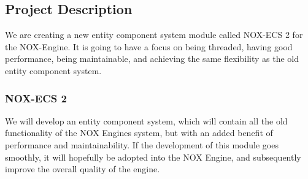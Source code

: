 \subsection{Project Description}
We are creating a new entity component system module called NOX-ECS 2 for the NOX-Engine. 
It is going to have a focus on being threaded, having good performance, being maintainable, and achieving the same flexibility as the old entity component system.

\subsubsection{NOX-ECS 2}
We will develop an entity component system, which will contain all the old functionality of the NOX Engines system, but with an added benefit of performance and maintainability. 
If the development of this module goes smoothly, it will hopefully be adopted into the NOX Engine, and subsequently improve the overall quality of the engine.
